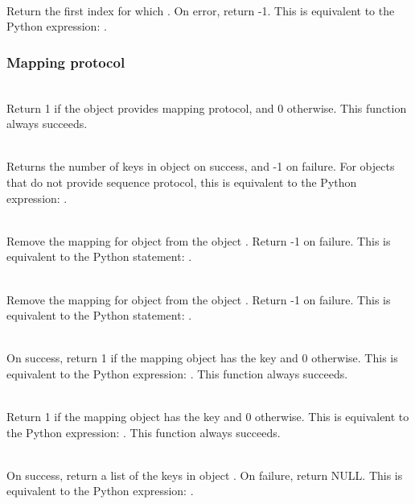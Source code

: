      \\
	 Return the first index for which .  On error,
	 return -1.    This is equivalent to the Python
	 expression: .

\subsubsection{Mapping protocol}

     \\
         Return 1 if the object provides mapping protocol, and 0
	 otherwise.  
	 This function always succeeds.


     \\
         Returns the number of keys in object  on success, and -1 on
	 failure.  For objects that do not provide sequence protocol,
	 this is equivalent to the Python expression: .


     \\
	 Remove the mapping for object  from the object .
	 Return -1 on failure.  This is equivalent to
	 the Python statement: .


     \\
	 Remove the mapping for object  from the object .
	 Return -1 on failure.  This is equivalent to
	 the Python statement: .


     \\
	 On success, return 1 if the mapping object has the key 
	 and 0 otherwise.  This is equivalent to the Python expression:
	 . 
	 This function always succeeds.


     \\
	 Return 1 if the mapping object has the key 
	 and 0 otherwise.  This is equivalent to the Python expression:
	 . 
	 This function always succeeds.


     \\
         On success, return a list of the keys in object .  On
	 failure, return NULL. This is equivalent to the Python
	 expression: .


